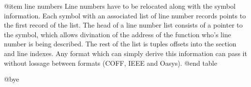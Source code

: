 @item line numbers
Line numbers have to be relocated along with the symbol information.
Each symbol with an associated list of line number records points to
the first record of the list.  The head of a line number list consists
of a pointer to the symbol, which allows divination of the address of
the function who's line number is being described. The rest of the
list is tuples offsets into the section and line indexes. Any format
which can simply derive this information can pass it without lossage
between formats (COFF, IEEE and Oasys).
@end table


@bye



